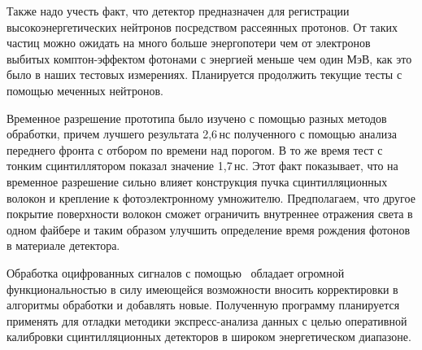 Также надо учесть факт, что детектор предназначен для регистрации высокоэнергетических нейтронов посредством рассеянных протонов. От таких частиц можно ожидать на много больше энергопотери чем от электронов выбитых комптон-эффектом фотонами с энергией меньше чем один МэВ, как это было в наших тестовых измерениях. Планируется продолжить текущие тесты с помощью меченных нейтронов.

Временное разрешение прототипа было изучено с помощью разных методов обработки, причем лучшего результата 2,6\,нс полученного с помощью анализа переднего фронта с отбором по времени над порогом. В то же время тест с тонким сцинтиллятором показал значение 1,7\,нс. Этот факт показывает, что на временное разрешение сильно влияет конструкция пучка сцинтилляционных волокон и крепление к фотоэлектронному умножителю. Предполагаем, что другое покрытие поверхности волокон сможет ограничить внутреннее отражения света в одном файбере и таким образом улучшить определение время рождения фотонов в материале детектора.

Обработка оцифрованных сигналов с помощью \er\ обладает огромной функциональностью в силу имеющейся возможности вносить корректировки в алгоритмы обработки и добавлять новые. Полученную программу планируется применять для отладки методики экспресс-анализа данных с целью оперативной калибровки сцинтилляционных детекторов в широком энергетическом диапазоне.

%
%
%
